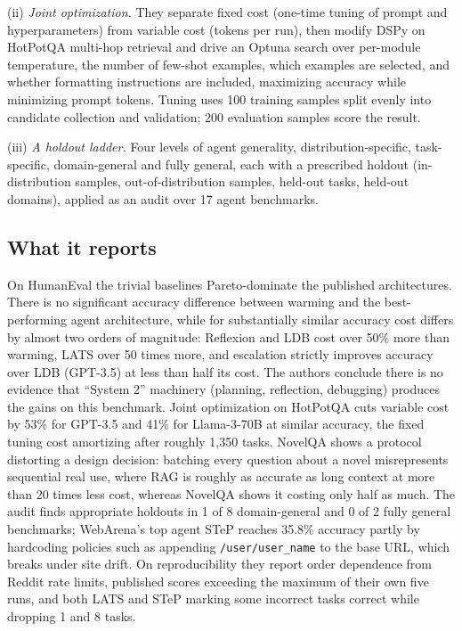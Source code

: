 (ii) \textit{Joint optimization.} They separate fixed cost (one-time tuning of prompt and hyperparameters) from variable cost (tokens per run), then modify DSPy on HotPotQA multi-hop retrieval and drive an Optuna search over per-module temperature, the number of few-shot examples, which examples are selected, and whether formatting instructions are included, maximizing accuracy while minimizing prompt tokens. Tuning uses 100 training samples split evenly into candidate collection and validation; 200 evaluation samples score the result.

(iii) \textit{A holdout ladder.} Four levels of agent generality, distribution-specific, task-specific, domain-general and fully general, each with a prescribed holdout (in-distribution samples, out-of-distribution samples, held-out tasks, held-out domains), applied as an audit over 17 agent benchmarks.

\subsection{What it reports}

On HumanEval the trivial baselines Pareto-dominate the published architectures. There is no significant accuracy difference between warming and the best-performing agent architecture, while for substantially similar accuracy cost differs by almost two orders of magnitude: Reflexion and LDB cost over 50\% more than warming, LATS over 50 times more, and escalation strictly improves accuracy over LDB (GPT-3.5) at less than half its cost. The authors conclude there is no evidence that ``System 2'' machinery (planning, reflection, debugging) produces the gains on this benchmark. Joint optimization on HotPotQA cuts variable cost by 53\% for GPT-3.5 and 41\% for Llama-3-70B at similar accuracy, the fixed tuning cost amortizing after roughly 1,350 tasks. NovelQA shows a protocol distorting a design decision: batching every question about a novel misrepresents sequential real use, where RAG is roughly as accurate as long context at more than 20 times less cost, whereas NovelQA shows it costing only half as much. The audit finds appropriate holdouts in 1 of 8 domain-general and 0 of 2 fully general benchmarks; WebArena's top agent STeP reaches 35.8\% accuracy partly by hardcoding policies such as appending \texttt{/user/user\_name} to the base URL, which breaks under site drift. On reproducibility they report order dependence from Reddit rate limits, published scores exceeding the maximum of their own five runs, and both LATS and STeP marking some incorrect tasks correct while dropping 1 and 8 tasks.

